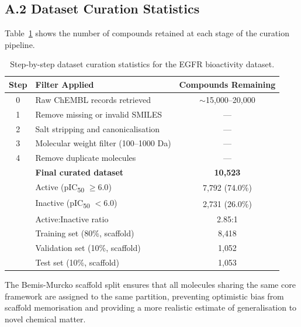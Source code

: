 \subsection*{A.2 Dataset Curation Statistics}

Table~\ref{tab:app_curation} shows the number of compounds
retained at each stage of the curation pipeline.

\begin{table}[H]
\caption{Step-by-step dataset curation statistics for the
         EGFR bioactivity dataset.}
\label{tab:app_curation}
\centering
\begin{tabular}{@{}clc@{}}
\toprule
\textbf{Step} & \textbf{Filter Applied}
              & \textbf{Compounds Remaining} \\
\midrule
0 & Raw ChEMBL records retrieved           & $\sim$15{,}000--20{,}000 \\
1 & Remove missing or invalid SMILES       & --- \\
2 & Salt stripping and canonicalisation    & --- \\
3 & Molecular weight filter (100--1000 Da) & --- \\
4 & Remove duplicate molecules             & --- \\
\midrule
  & \textbf{Final curated dataset}         & \textbf{10{,}523} \\
\midrule
  & Active (pIC\textsubscript{50}
    $\geq 6.0$)                            & 7{,}792 (74.0\%) \\
  & Inactive (pIC\textsubscript{50}
    $< 6.0$)                              & 2{,}731 (26.0\%) \\
  & Active:Inactive ratio                 & 2.85:1 \\
\midrule
  & Training set (80\%, scaffold)         & 8{,}418 \\
  & Validation set (10\%, scaffold)       & 1{,}052 \\
  & Test set (10\%, scaffold)             & 1{,}053 \\
\bottomrule
\end{tabular}
\end{table}

\noindent
The Bemis-Murcko scaffold split ensures that all molecules
sharing the same core framework are assigned to the same
partition, preventing optimistic bias from scaffold
memorisation and providing a more realistic estimate of
generalisation to novel chemical matter.


\clearpage
